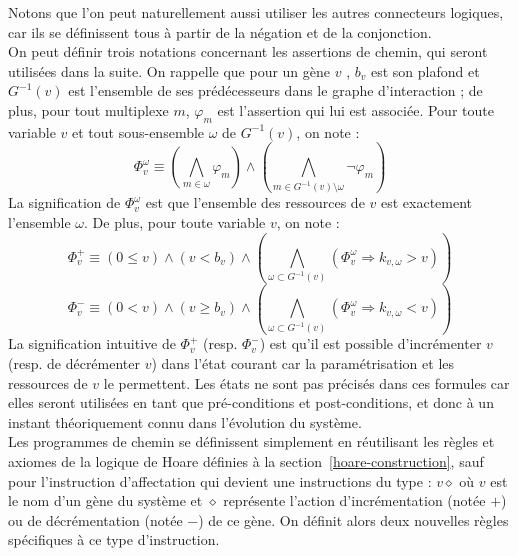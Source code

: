 Notons que l'on peut naturellement aussi utiliser les autres connecteurs logiques, car ils se définissent tous à partir de la négation et de la conjonction.\\

On peut définir trois notations concernant les assertions de chemin, qui seront utilisées dans la suite. On rappelle que pour un gène $v$%
, $b_v$ est son plafond et $G^{-1}(v)$ est l'ensemble de ses prédécesseurs dans le graphe d'interaction%
; de plus, pour tout multiplexe $m$, $\varphi_m$ est l'assertion qui lui est associée. Pour toute variable $v$ et tout sous-ensemble $\omega$ de $G^{-1}(v)$, on note :
  $$\Phi^{\omega}_v \equiv ( \bigwedge_{m \in \omega} \varphi_m ) \wedge ( \bigwedge_{m \in G^{-1}(v) \setminus \omega} \neg \varphi_m )$$
La signification de $\Phi^{\omega}_v$ est que l'ensemble des ressources de $v$ est exactement l'ensemble $\omega$. De plus, pour toute variable $v$, on note :
  $$\Phi^+_v \equiv (0 \leq v) \wedge (v < b_v) \wedge (\bigwedge_{\omega \subset G^{-1}(v)} (\Phi^{\omega}_v \Rightarrow k_{v, \omega} > v))$$
  $$\Phi^-_v \equiv (0 < v) \wedge (v \geq b_v) \wedge (\bigwedge_{\omega \subset G^{-1}(v)} (\Phi^{\omega}_v \Rightarrow k_{v, \omega} < v))$$
La signification intuitive de $\Phi^+_v$ (resp. $\Phi^-_v$) est qu'il est possible d'incrémenter $v$ (resp. de décrémenter $v$) dans l'état courant car la paramétrisation et les ressources de $v$ le permettent. Les états ne sont pas précisés dans ces formules car elles seront utilisées en tant que pré-conditions et post-conditions, et donc à un instant théoriquement connu dans l'évolution du système.\\

Les programmes de chemin se définissent simplement en réutilisant les règles et axiomes de la logique de Hoare définies à la section~\ref{hoare-construction}, sauf pour l'instruction d'affectation qui devient une instructions du type : \og $v \diamond$ \fg{} où $v$ est le nom d'un gène du système et $\diamond$ représente l'action d'incrémentation (notée $+$) ou de décrémentation (notée $-$) de ce gène. On définit alors deux nouvelles règles spécifiques à ce type d'instruction.


